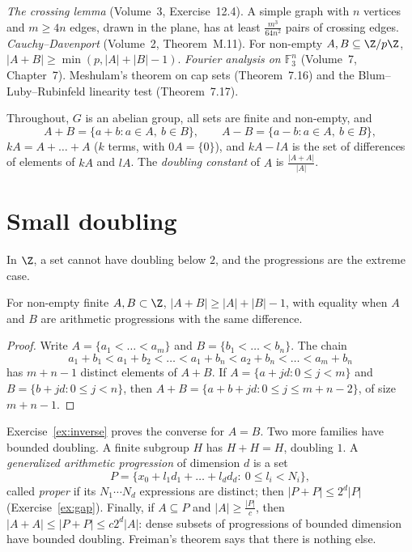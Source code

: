 \begin{reminder}
\emph{The crossing lemma} (Volume~3, Exercise~12.4). A simple graph with $n$ vertices and $m\ge4n$ edges, drawn in the plane, has at least $\frac{m^3}{64n^2}$ pairs of crossing edges.
\emph{Cauchy--Davenport} (Volume~2, Theorem~M.11). For non-empty $A,B\subseteq\Z/p\Z$, $|A+B|\ge\min(p,|A|+|B|-1)$.
\emph{Fourier analysis on $\mathbb F_3^n$} (Volume~7, Chapter~7). Meshulam's theorem on cap sets (Theorem~7.16) and the Blum--Luby--Rubinfeld linearity test (Theorem~7.17).
\end{reminder}

Throughout, $G$ is an abelian group, all sets are finite and non-empty, and
\[
A+B=\{a+b:a\in A,\ b\in B\},\qquad A-B=\{a-b:a\in A,\ b\in B\},
\]
$kA=A+\dots+A$ ($k$ terms, with $0A=\{0\}$), and $kA-lA$ is the set of differences of elements of $kA$ and $lA$. The \emph{doubling constant} of $A$ is $\frac{|A+A|}{|A|}$.

\section{Small doubling}

In $\Z$, a set cannot have doubling below $2$, and the progressions are the extreme case.

\begin{lemma}\label{lem:chain}
For non-empty finite $A,B\subset\Z$, $|A+B|\ge|A|+|B|-1$, with equality when $A$ and $B$ are arithmetic progressions with the same difference.
\end{lemma}
\begin{proof}
Write $A=\{a_1<\dots<a_m\}$ and $B=\{b_1<\dots<b_n\}$. The chain
\[
a_1+b_1<a_1+b_2<\dots<a_1+b_n<a_2+b_n<\dots<a_m+b_n
\]
has $m+n-1$ distinct elements of $A+B$. If $A=\{a+jd:0\le j<m\}$ and $B=\{b+jd:0\le j<n\}$, then $A+B=\{a+b+jd:0\le j\le m+n-2\}$, of size $m+n-1$.
\end{proof}

Exercise~\ref{ex:inverse} proves the converse for $A=B$. Two more families have bounded doubling. A finite subgroup $H$ has $H+H=H$, doubling $1$. A \emph{generalized arithmetic progression} of dimension $d$ is a set
\[
P=\{x_0+l_1d_1+\dots+l_dd_d:\ 0\le l_i<N_i\},
\]
called \emph{proper} if its $N_1\cdots N_d$ expressions are distinct; then $|P+P|\le2^d|P|$ (Exercise~\ref{ex:gap}). Finally, if $A\subseteq P$ and $|A|\ge\frac{|P|}c$, then $|A+A|\le|P+P|\le c2^d|A|$: dense subsets of progressions of bounded dimension have bounded doubling. Freiman's theorem says that there is nothing else.

